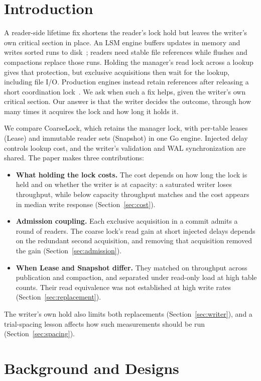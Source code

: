 \documentclass[conference]{IEEEtran}
\begin{document}
\section{Introduction}
\label{sec:introduction}
A reader-side lifetime fix shortens the reader's lock hold but leaves the writer's own critical section in place. An LSM engine buffers updates in memory and writes sorted runs to disk~\cite{oneil1996lsm,luo2020}; readers need stable file references while flushes and compactions replace those runs. Holding the manager's read lock across a lookup gives that protection, but exclusive acquisitions then wait for the lookup, including file I/O. Production engines instead retain references after releasing a short coordination lock~\cite{leveldb,rocksdb,pebble}. We ask when such a fix helps, given the writer's own critical section. Our answer is that the writer decides the outcome, through how many times it acquires the lock and how long it holds it.

We compare CoarseLock, which retains the manager lock, with per-table leases (Lease) and immutable reader sets (Snapshot) in one Go engine. Injected delay controls lookup cost, and the writer's validation and WAL synchronization are shared. The paper makes three contributions:
\begin{itemize}
\item \textbf{What holding the lock costs.} The cost depends on how long the lock is held and on whether the writer is at capacity: a saturated writer loses throughput, while below capacity throughput matches and the cost appears in median write response (Section~\ref{sec:cost}).
\item \textbf{Admission coupling.} Each exclusive acquisition in a commit admits a round of readers. The coarse lock's read gain at short injected delays depends on the redundant second acquisition, and removing that acquisition removed the gain (Section~\ref{sec:admission}).
\item \textbf{When Lease and Snapshot differ.} They matched on throughput across publication and compaction, and separated under read-only load at high table counts. Their read equivalence was not established at high write rates (Section~\ref{sec:replacement}).
\end{itemize}
The writer's own hold also limits both replacements (Section~\ref{sec:writer}), and a trial-spacing lesson affects how such measurements should be run (Section~\ref{sec:spacing}).

\section{Background and Designs}
\end{document}
